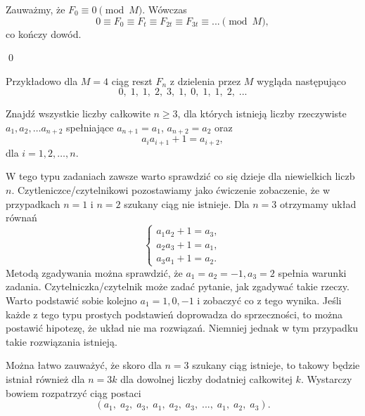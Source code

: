 \vspace{10px}

\noindent
Zauważmy, że $F_0 \equiv 0 \pmod{M}$. Wówczas
\[
	0 \equiv F_0 \equiv F_t \equiv F_{2t} \equiv F_{3t} \equiv ... \pmod{M},
\]
co kończy dowód.

\qed

\noindent
Przykładowo dla $M = 4$ ciąg reszt $F_n$ z dzielenia przez $M$ wygląda następująco
\[
	0,\; 1,\; 1,\; 2,\; 3,\; 1,\; 0,\; 1,\; 1,\; 2,\; ...
\]


\noindent
Znajdź wszystkie liczby całkowite $n \geq 3$, dla których istnieją liczby rzeczywiste $a_1, a_2, \dots a_{n + 2}$ spełniające $a_{n + 1} = a_1$, $a_{n + 2} = a_2$ oraz
\[
	a_ia_{i + 1} + 1 = a_{i + 2},
\]
dla $i = 1, 2, \dots, n$.


\newpage
{}

\noindent
W tego typu zadaniach zawsze warto sprawdzić co się dzieje dla niewielkich liczb $n$. Czytleniczce/czytelnikowi pozostawiamy jako ćwiczenie zobaczenie, że w przypadkach $n = 1$ i $n = 2$ szukany ciąg nie istnieje. Dla $n = 3$ otrzymamy układ równań
\[
	\begin{cases}
		a_1a_2 + 1 = a_3, \\
		a_2a_3 + 1 = a_1, \\
		a_3a_1 + 1 = a_2.
	\end{cases}
\]
Metodą zgadywania można sprawdzić, że $a_1 = a_2 = - 1, a_3 = 2$ spełnia warunki zadania. Czytelniczka/czytelnik może zadać pytanie, jak zgadywać takie rzeczy. Warto podstawić sobie kolejno $a_1 = 1, 0, -1$ i zobaczyć co z tego wynika. Jeśli każde z tego typu prostych podstawień doprowadza do sprzeczności, to można postawić hipotezę, że układ nie ma rozwiązań. Niemniej jednak w tym przypadku takie rozwiązania istnieją.

\vspace{10px}
\noindent
Można łatwo zauważyć, że skoro dla $n = 3$ szukany ciąg istnieje, to takowy będzie istniał również dla $n = 3k$ dla dowolnej liczby dodatniej całkowitej $k$. Wystarczy bowiem rozpatrzyć ciąg postaci
\[
	(a_1, \; a_2, \; a_3, \; a_1, \; a_2, \; a_3, \; ..., \; a_1, \; a_2, \; a_3).
\]

